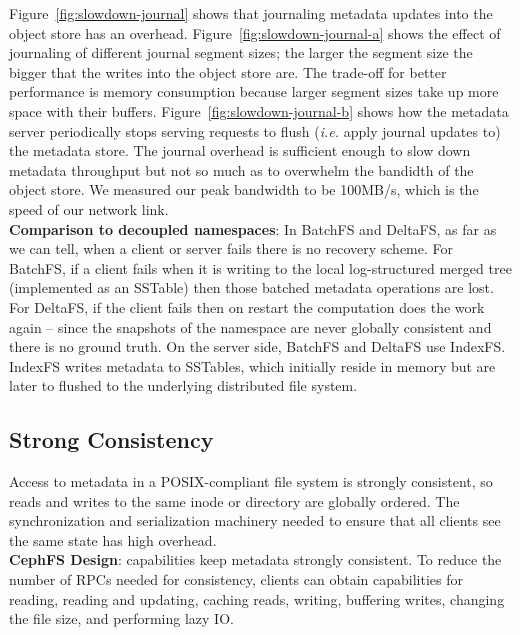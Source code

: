 Figure~\ref{fig:slowdown-journal} shows that journaling metadata updates into
the object store has an overhead. Figure~\ref{fig:slowdown-journal-a} shows the
effect of journaling of different journal segment sizes; the larger the segment
size the bigger that the writes into the object store are. The trade-off for
better performance is memory consumption because larger segment sizes take up
more space with their buffers. Figure~\ref{fig:slowdown-journal-b} shows how
the metadata server periodically stops serving requests to flush ({\it i.e.}
apply journal updates to) the metadata store.  The journal overhead is
sufficient enough to slow down metadata throughput but not so much as to
overwhelm the bandidth of the object store. We measured our peak bandwidth to
be 100MB/s, which is the speed of our network link.\\

\noindent\textbf{Comparison to decoupled namespaces}: In BatchFS and DeltaFS,
as far as we can tell, when a client or server fails there is no recovery
scheme. For BatchFS, if a client fails when it is writing to the local
log-structured merged tree (implemented as an SSTable) then those batched
metadata operations are lost. For DeltaFS, if the client fails then on restart
the computation does the work again -- since the snapshots of the namespace are
never globally consistent and there is no ground truth.  On the server side,
BatchFS and DeltaFS use IndexFS. IndexFS writes metadata to SSTables, which
initially reside in memory but are later to flushed to the underlying
distributed file system.

\subsection{Strong Consistency} 
\label{sec:strong-consistency}

Access to metadata in a POSIX-compliant file system is strongly consistent, so
reads and writes to the same inode or directory are globally ordered.  The
synchronization and serialization machinery needed to ensure that all clients
see the same state has high overhead.\\

\noindent\textbf{CephFS Design}: capabilities keep metadata strongly
consistent. To reduce the number of RPCs needed for consistency, clients can
obtain capabilities for reading, reading and updating, caching reads, writing,
buffering writes, changing the file size, and performing lazy IO.

